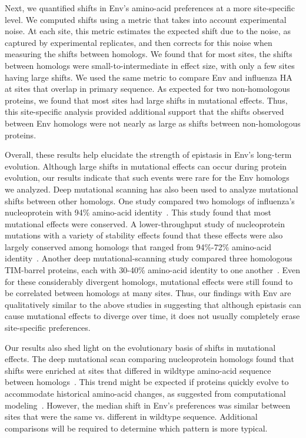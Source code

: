 \documentclass[9pt,lineno]{elife}
\begin{document}
Next, we quantified shifts in Env's amino-acid preferences at a more site-specific level.
We computed shifts using a metric that takes into account experimental noise.
At each site, this metric estimates the expected shift due to the noise, as captured by experimental replicates, and then corrects for this noise when measuring the shifts between homologs.
We found that for most sites, the shifts between homologs were small-to-intermediate in effect size, with only a few sites having large shifts.
We used the same metric to compare Env and influenza HA at sites that overlap in primary sequence.
As expected for two non-homologous proteins, we found that most sites had large shifts in mutational effects.
Thus, this site-specific analysis provided additional support that the shifts observed between Env homologs were not nearly as large as shifts between non-homologous proteins.

Overall, these results help elucidate the strength of epistasis in Env's long-term evolution.
Although large shifts in mutational effects can occur during protein evolution, our results indicate that such events were rare for the Env homologs we analyzed.
Deep mutational scanning has also been used to analyze mutational shifts between other homologs.
One study compared two homologs of influenza's nucleoprotein with 94\% amino-acid identity~\cite{doud2015site}.
This study found that most mutational effects were conserved.
A lower-throughput study of nucleoprotein mutations with a variety of stability effects found that these effects were also largely conserved among homologs that ranged from 94\%-72\% amino-acid identity~\cite{ashenberg2013mutational}.
Another deep mutational-scanning study compared three homologous TIM-barrel proteins, each with 30-40\% amino-acid identity to one another~\cite{chan2017correlation}.
Even for these considerably divergent homologs, mutational effects were still found to be correlated between homologs at many sites.
Thus, our findings with Env are qualitatively similar to the above studies in suggesting that although epistasis can cause mutational effects to diverge over time, it does not usually completely erase site-specific preferences.

Our results also shed light on the evolutionary basis of shifts in mutational effects.
The deep mutational scan comparing nucleoprotein homologs found that shifts were enriched at sites that differed in wildtype amino-acid sequence between homologs~\cite{doud2015site}.
This trend might be expected if proteins quickly evolve to accommodate historical amino-acid changes, as suggested from computational modeling~\cite{pollock2012amino}.
However, the median shift in Env's preferences was similar between sites that were the same vs. different in wildtype sequence.
Additional comparisons will be required to determine which pattern is more typical.
\end{document}
